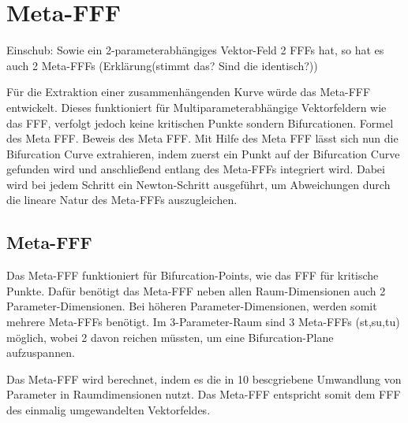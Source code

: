 \documentclass[11pt]{article}
\begin{document}
\section{Meta-FFF}
Einschub:
Sowie ein 2-parameterabhängiges Vektor-Feld 2 FFFs hat, so hat es auch 2 Meta-FFFs (Erklärung(stimmt das? Sind die identisch?))

Für die Extraktion einer zusammenhängenden Kurve würde das Meta-FFF entwickelt. Dieses funktioniert für Multiparameterabhängige Vektorfeldern wie das FFF, verfolgt jedoch keine kritischen Punkte sondern Bifurcationen.
Formel des Meta FFF.
Beweis des Meta FFF.
Mit Hilfe des Meta FFF lässt sich nun die Bifurcation Curve extrahieren, indem zuerst ein Punkt auf der Bifurcation Curve gefunden wird und anschließend entlang des Meta-FFFs integriert wird. Dabei wird bei jedem Schritt ein Newton-Schritt ausgeführt, um Abweichungen durch die lineare Natur des Meta-FFFs auszugleichen.
\subsection{Meta-FFF}
Das Meta-FFF funktioniert für Bifurcation-Points, wie das FFF für kritische Punkte.
Dafür benötigt das Meta-FFF neben allen Raum-Dimensionen auch 2 Parameter-Dimensionen.
Bei höheren Parameter-Dimensionen, werden somit mehrere Meta-FFFs benötigt.
Im 3-Parameter-Raum sind 3 Meta-FFFs (st,su,tu) möglich, wobei 2 davon reichen müssten, um eine Bifurcation-Plane aufzuspannen.

Das Meta-FFF wird berechnet, indem es die in 10 bescgriebene Umwandlung von Parameter in Raumdimensionen nutzt.
Das Meta-FFF entspricht somit dem FFF des einmalig umgewandelten Vektorfeldes.
\end{document}

